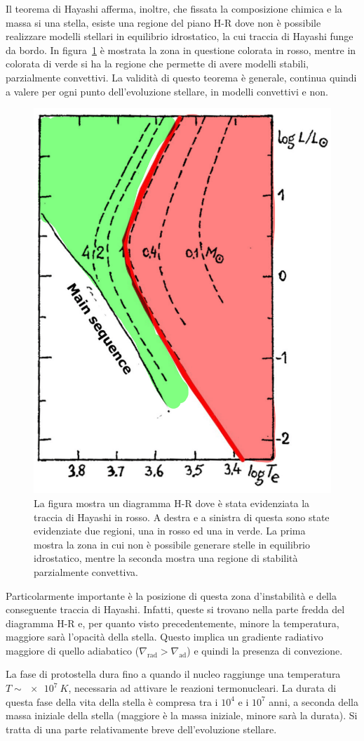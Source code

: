 Il teorema di Hayashi afferma, inoltre, che fissata la composizione chimica e la massa si una stella, esiste una regione del piano H-R dove non è possibile realizzare modelli stellari in equilibrio idrostatico, la cui traccia di Hayashi funge da bordo. In figura~\ref{fig:hay} è mostrata la zona in questione colorata in rosso, mentre in colorata di verde si ha la regione che permette di avere modelli stabili, parzialmente convettivi. La validità di questo teorema è generale,  continua quindi a valere per ogni punto dell'evoluzione stellare, in modelli convettivi e non.

\begin{figure}
    \centering
    \includegraphics[width = 0.3 \textwidth]{immagini/hayashi-1.png}
    \caption{La figura mostra un diagramma H-R dove è stata evidenziata la traccia di Hayashi in rosso. A destra e a sinistra di questa sono state evidenziate due regioni, una in rosso ed una in verde. La prima mostra la zona in cui non è possibile generare stelle in equilibrio idrostatico, mentre la seconda mostra una regione di stabilità parzialmente convettiva.}\label{fig:hay}
\end{figure}

Particolarmente importante è la posizione di questa zona d'instabilità e della conseguente traccia di Hayashi. Infatti, queste si trovano nella parte fredda del diagramma H-R e, per quanto visto precedentemente, minore la temperatura, maggiore sarà l'opacità della stella. Questo implica un gradiente radiativo maggiore di quello adiabatico ($\nabla_{\mbox{rad}} > \nabla_{\mbox{ad}}$) e quindi la presenza di convezione.

La fase di protostella dura fino a quando il nucleo raggiunge una temperatura $T \sim \SI{e7}{K}$, necessaria ad attivare le reazioni termonucleari. La durata di questa fase della vita della stella è compresa tra i $10^4$ e i $10^7$ anni, a seconda della massa iniziale della stella (maggiore è la massa iniziale, minore sarà la durata). Si tratta di una parte relativamente breve dell'evoluzione stellare.